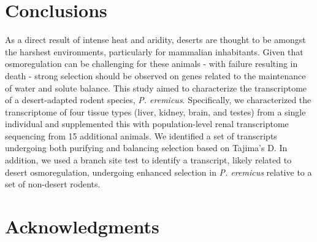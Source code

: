 \documentclass[11pt]{article}
\newcommand{\peer}{\textit{P. eremicus}}
\begin{document}
\section*{Conclusions}

As a direct result of intense heat and aridity, deserts are thought to be amongst the harshest environments, particularly for mammalian inhabitants. Given that osmoregulation can be challenging for these animals - with failure resulting in death - strong selection should be observed on genes related to the maintenance of water and solute balance. This study aimed to characterize the transcriptome of a desert-adapted rodent species, \peer. Specifically, we characterized the transcriptome of four tissue types (liver, kidney, brain, and testes) from a single individual and supplemented this with population-level renal transcriptome sequencing from 15 additional animals. We identified a set of transcripts undergoing both purifying and balancing selection based on Tajima's D. In addition, we used a branch site test to identify a transcript, likely related to desert osmoregulation, undergoing enhanced selection in \peer\: relative to a set of non-desert rodents.  \\




\section*{Acknowledgments}



\end{document}
